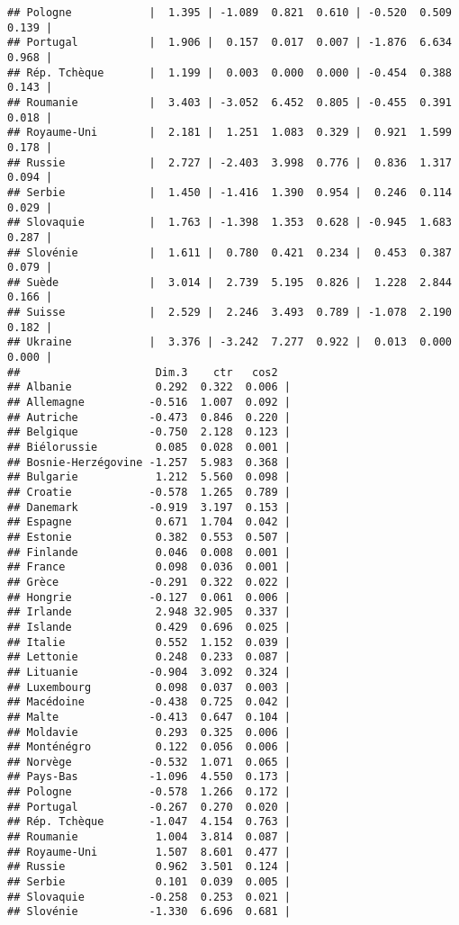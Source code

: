 \documentclass[
]{article}
\begin{document}
\begin{verbatim}
## Pologne            |  1.395 | -1.089  0.821  0.610 | -0.520  0.509  0.139 |
## Portugal           |  1.906 |  0.157  0.017  0.007 | -1.876  6.634  0.968 |
## Rép. Tchèque       |  1.199 |  0.003  0.000  0.000 | -0.454  0.388  0.143 |
## Roumanie           |  3.403 | -3.052  6.452  0.805 | -0.455  0.391  0.018 |
## Royaume-Uni        |  2.181 |  1.251  1.083  0.329 |  0.921  1.599  0.178 |
## Russie             |  2.727 | -2.403  3.998  0.776 |  0.836  1.317  0.094 |
## Serbie             |  1.450 | -1.416  1.390  0.954 |  0.246  0.114  0.029 |
## Slovaquie          |  1.763 | -1.398  1.353  0.628 | -0.945  1.683  0.287 |
## Slovénie           |  1.611 |  0.780  0.421  0.234 |  0.453  0.387  0.079 |
## Suède              |  3.014 |  2.739  5.195  0.826 |  1.228  2.844  0.166 |
## Suisse             |  2.529 |  2.246  3.493  0.789 | -1.078  2.190  0.182 |
## Ukraine            |  3.376 | -3.242  7.277  0.922 |  0.013  0.000  0.000 |
##                     Dim.3    ctr   cos2  
## Albanie             0.292  0.322  0.006 |
## Allemagne          -0.516  1.007  0.092 |
## Autriche           -0.473  0.846  0.220 |
## Belgique           -0.750  2.128  0.123 |
## Biélorussie         0.085  0.028  0.001 |
## Bosnie-Herzégovine -1.257  5.983  0.368 |
## Bulgarie            1.212  5.560  0.098 |
## Croatie            -0.578  1.265  0.789 |
## Danemark           -0.919  3.197  0.153 |
## Espagne             0.671  1.704  0.042 |
## Estonie             0.382  0.553  0.507 |
## Finlande            0.046  0.008  0.001 |
## France              0.098  0.036  0.001 |
## Grèce              -0.291  0.322  0.022 |
## Hongrie            -0.127  0.061  0.006 |
## Irlande             2.948 32.905  0.337 |
## Islande             0.429  0.696  0.025 |
## Italie              0.552  1.152  0.039 |
## Lettonie            0.248  0.233  0.087 |
## Lituanie           -0.904  3.092  0.324 |
## Luxembourg          0.098  0.037  0.003 |
## Macédoine          -0.438  0.725  0.042 |
## Malte              -0.413  0.647  0.104 |
## Moldavie            0.293  0.325  0.006 |
## Monténégro          0.122  0.056  0.006 |
## Norvège            -0.532  1.071  0.065 |
## Pays-Bas           -1.096  4.550  0.173 |
## Pologne            -0.578  1.266  0.172 |
## Portugal           -0.267  0.270  0.020 |
## Rép. Tchèque       -1.047  4.154  0.763 |
## Roumanie            1.004  3.814  0.087 |
## Royaume-Uni         1.507  8.601  0.477 |
## Russie              0.962  3.501  0.124 |
## Serbie              0.101  0.039  0.005 |
## Slovaquie          -0.258  0.253  0.021 |
## Slovénie           -1.330  6.696  0.681 |

\end{verbatim}
\end{document}

